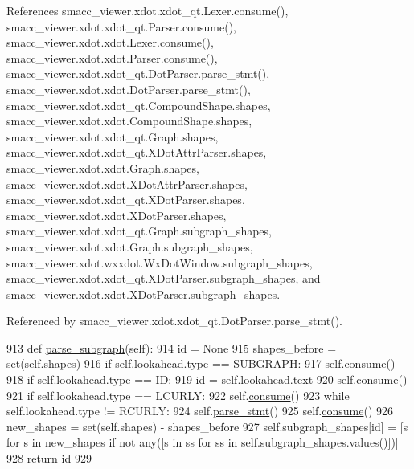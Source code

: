 References smacc\+\_\+viewer.\+xdot.\+xdot\+\_\+qt.\+Lexer.\+consume(), smacc\+\_\+viewer.\+xdot.\+xdot\+\_\+qt.\+Parser.\+consume(), smacc\+\_\+viewer.\+xdot.\+xdot.\+Lexer.\+consume(), smacc\+\_\+viewer.\+xdot.\+xdot.\+Parser.\+consume(), smacc\+\_\+viewer.\+xdot.\+xdot\+\_\+qt.\+Dot\+Parser.\+parse\+\_\+stmt(), smacc\+\_\+viewer.\+xdot.\+xdot.\+Dot\+Parser.\+parse\+\_\+stmt(), smacc\+\_\+viewer.\+xdot.\+xdot\+\_\+qt.\+Compound\+Shape.\+shapes, smacc\+\_\+viewer.\+xdot.\+xdot.\+Compound\+Shape.\+shapes, smacc\+\_\+viewer.\+xdot.\+xdot\+\_\+qt.\+Graph.\+shapes, smacc\+\_\+viewer.\+xdot.\+xdot\+\_\+qt.\+X\+Dot\+Attr\+Parser.\+shapes, smacc\+\_\+viewer.\+xdot.\+xdot.\+Graph.\+shapes, smacc\+\_\+viewer.\+xdot.\+xdot.\+X\+Dot\+Attr\+Parser.\+shapes, smacc\+\_\+viewer.\+xdot.\+xdot\+\_\+qt.\+X\+Dot\+Parser.\+shapes, smacc\+\_\+viewer.\+xdot.\+xdot.\+X\+Dot\+Parser.\+shapes, smacc\+\_\+viewer.\+xdot.\+xdot\+\_\+qt.\+Graph.\+subgraph\+\_\+shapes, smacc\+\_\+viewer.\+xdot.\+xdot.\+Graph.\+subgraph\+\_\+shapes, smacc\+\_\+viewer.\+xdot.\+wxxdot.\+Wx\+Dot\+Window.\+subgraph\+\_\+shapes, smacc\+\_\+viewer.\+xdot.\+xdot\+\_\+qt.\+X\+Dot\+Parser.\+subgraph\+\_\+shapes, and smacc\+\_\+viewer.\+xdot.\+xdot.\+X\+Dot\+Parser.\+subgraph\+\_\+shapes.



Referenced by smacc\+\_\+viewer.\+xdot.\+xdot\+\_\+qt.\+Dot\+Parser.\+parse\+\_\+stmt().


\begin{DoxyCode}
913     \textcolor{keyword}{def }\hyperlink{classsmacc__viewer_1_1xdot_1_1xdot__qt_1_1DotParser_ac71e76d074947d5d4929bdc699df9614}{parse\_subgraph}(self):
914         id = \textcolor{keywordtype}{None}
915         shapes\_before = set(self.shapes)
916         \textcolor{keywordflow}{if} self.lookahead.type == SUBGRAPH:
917             self.\hyperlink{classsmacc__viewer_1_1xdot_1_1xdot__qt_1_1Parser_aba6f69f48f1d4e25b13e4cb297f509e6}{consume}()
918             \textcolor{keywordflow}{if} self.lookahead.type == ID:
919                 id = self.lookahead.text
920                 self.\hyperlink{classsmacc__viewer_1_1xdot_1_1xdot__qt_1_1Parser_aba6f69f48f1d4e25b13e4cb297f509e6}{consume}()
921         \textcolor{keywordflow}{if} self.lookahead.type == LCURLY:
922             self.\hyperlink{classsmacc__viewer_1_1xdot_1_1xdot__qt_1_1Parser_aba6f69f48f1d4e25b13e4cb297f509e6}{consume}()
923             \textcolor{keywordflow}{while} self.lookahead.type != RCURLY:
924                 self.\hyperlink{classsmacc__viewer_1_1xdot_1_1xdot__qt_1_1DotParser_aab4ab0bb958d2ff8e7f35ce9828eff88}{parse\_stmt}()
925             self.\hyperlink{classsmacc__viewer_1_1xdot_1_1xdot__qt_1_1Parser_aba6f69f48f1d4e25b13e4cb297f509e6}{consume}()
926         new\_shapes = set(self.shapes) - shapes\_before
927         self.subgraph\_shapes[id] = [s \textcolor{keywordflow}{for} s \textcolor{keywordflow}{in} new\_shapes \textcolor{keywordflow}{if} \textcolor{keywordflow}{not} any([s \textcolor{keywordflow}{in} ss \textcolor{keywordflow}{for} ss \textcolor{keywordflow}{in} 
      self.subgraph\_shapes.values()])]
928         \textcolor{keywordflow}{return} id
929 
\end{DoxyCode}


